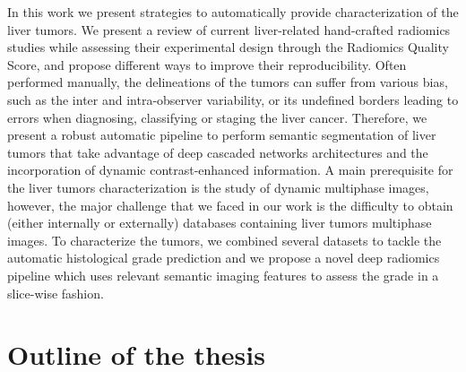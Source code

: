 In this work we present strategies to automatically provide characterization of the liver tumors.
We present a review of current liver-related hand-crafted radiomics studies while assessing their experimental design through the Radiomics Quality Score, and propose different ways to improve their reproducibility.
Often performed manually, the delineations of the tumors can suffer from various bias, such as the inter and intra-observer variability, or its undefined borders leading to errors when diagnosing, classifying or staging the liver cancer. Therefore, we present a robust automatic pipeline to perform semantic segmentation of liver tumors that take advantage of deep cascaded networks architectures and the incorporation of dynamic contrast-enhanced information. A main prerequisite for the liver tumors characterization is the study of dynamic multiphase images, however, the major challenge that we faced in our work is the difficulty to obtain (either internally or externally) databases containing liver tumors multiphase images. To characterize the tumors, we combined several datasets to tackle the automatic histological grade prediction and we propose a novel deep radiomics pipeline which uses relevant semantic imaging features to assess the grade in a slice-wise fashion.

\section*{Outline of the thesis}
\label{sec:Outline}

